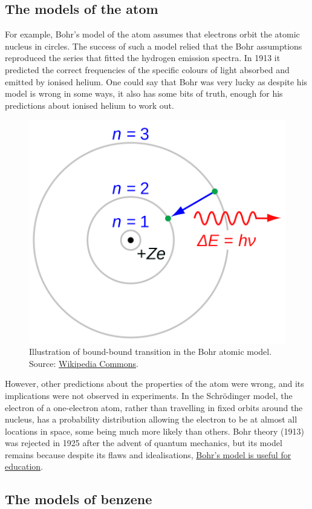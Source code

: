 \documentclass[
]{book}
\begin{document}
\hypertarget{the-models-of-the-atom}{%
\subsection{The models of the atom}\label{the-models-of-the-atom}}

For example, Bohr's model of the atom assumes that electrons orbit the atomic nucleus in circles. The success of such a model relied that the Bohr assumptions reproduced the series that fitted the hydrogen emission spectra. In 1913 it predicted the correct frequencies of the specific colours of light absorbed and emitted by ionised helium. One could say that Bohr was very lucky as despite his model is wrong in some ways, it also has some bits of truth, enough for his predictions about ionised helium to work out.



\begin{figure}[hbtp]

{\centering \includegraphics[width=0.33\linewidth]{Figures/bohr-atom-model} 

}

\caption{Illustration of bound-bound transition in the Bohr atomic model. Source: \href{https://commons.wikimedia.org/wiki/File:Bohr_atom_model.svg}{Wikipedia Commons}.}\label{fig:bohr-model}
\end{figure}

However, other predictions about the properties of the atom were wrong, and its implications were not observed in experiments. In the Schrödinger model, the electron of a one-electron atom, rather than travelling in fixed orbits around the nucleus, has a probability distribution allowing the electron to be at almost all locations in space, some being much more likely than others. Bohr theory (1913) was rejected in 1925 after the advent of quantum mechanics, but its model remains because despite its flaws and idealisations, \href{https://blogs.scientificamerican.com/guest-blog/why-it-s-okay-to-teach-wrong-ideas-in-physics/}{Bohr's model is useful for education}.

\hypertarget{the-models-of-benzene}{%
\subsection{The models of benzene}\label{the-models-of-benzene}}
\end{document}

